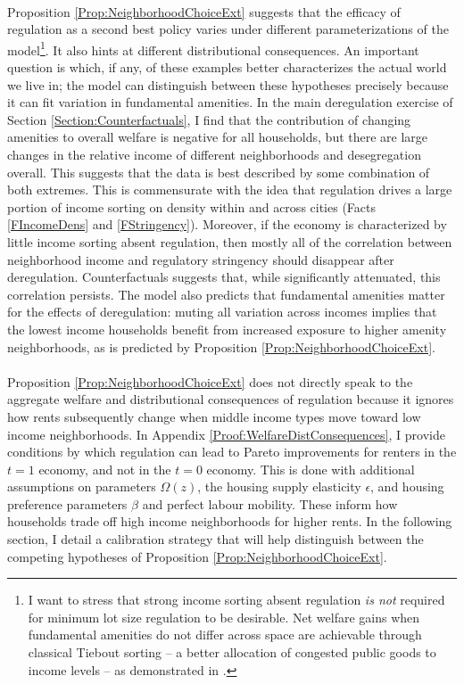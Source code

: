\documentclass[12pt]{article}
\begin{document}
\paragraph*{}
Proposition \ref{Prop:NeighborhoodChoiceExt}  suggests that the efficacy of regulation as a second best policy varies under different parameterizations of the model\footnote{I want to stress that strong income sorting absent regulation \textit{is not} required for minimum lot size regulation to be desirable. Net welfare gains when fundamental amenities do not differ across space are achievable through classical Tiebout sorting -- a better allocation of congested public goods to income levels -- as demonstrated in \cite{calabresetal}.}. It also hints at different distributional consequences. An important question is which, if any, of these examples better characterizes the actual world we live in; the model can distinguish between these hypotheses precisely because it can fit variation in fundamental amenities. In the main deregulation exercise of Section \ref{Section:Counterfactuals}, I find that the contribution of changing amenities to overall welfare is negative for all households, but there are large changes in the relative income of different neighborhoods and desegregation overall. This suggests that the data is best described by some combination of both extremes. This is commensurate with the idea that regulation drives a large portion of income sorting on density within and across cities (Facts \ref{FIncomeDens} and \ref{FStringency}). Moreover, if the economy is characterized by little income sorting absent regulation, then mostly all of the correlation between neighborhood income and regulatory stringency should disappear after deregulation. Counterfactuals suggests that, while significantly attenuated, this correlation persists. The model also predicts that fundamental amenities matter for the effects of deregulation: muting all variation across incomes implies that the lowest income households benefit from increased exposure to higher amenity neighborhoods, as is predicted by Proposition \ref{Prop:NeighborhoodChoiceExt}.

\paragraph*{}
Proposition \ref{Prop:NeighborhoodChoiceExt} does not directly speak to the aggregate welfare and distributional consequences of regulation because it ignores how rents subsequently change when middle income types move toward low income neighborhoods. In Appendix \ref{Proof:WelfareDistConsequences}, I provide conditions by which regulation can lead to Pareto improvements for renters in the $t = 1$ economy, and not in the $t = 0$ economy. This is done with additional assumptions on parameters $\Omega(z)$, the housing supply elasticity $\epsilon$, and housing preference parameters $\beta$ and perfect labour mobility. These inform how households trade off high income neighborhoods for higher rents. In the following section, I detail a calibration strategy that will help distinguish between the competing hypotheses of Proposition \ref{Prop:NeighborhoodChoiceExt}. 
\end{document}
